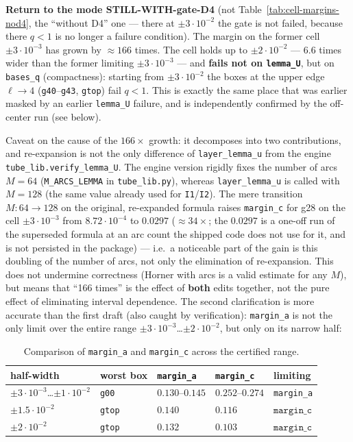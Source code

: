 \FloatBarrier

\textbf{Return to the mode STILL-WITH-gate-D4} (not Table~\ref{tab:cell-margins-nod4}, the ``without D4'' one ---
there at $\pm 3\cdot 10^{-2}$ the gate is not failed, because there $q<1$ is no longer
a failure condition). The margin on the former cell $\pm 3\cdot 10^{-3}$ has grown by
$\approx 166$ times. The cell holds up to $\pm 2\cdot 10^{-2}$ --- 6.6 times wider than the former
limiting $\pm 3\cdot 10^{-3}$ --- and \textbf{fails not on \texttt{lemma\_U}}, but on \texttt{bases\_q}
(compactness): starting from $\pm 3\cdot 10^{-2}$ the boxes at the upper edge
$\ell \to 4$ (\texttt{g40}--\texttt{g43}, \texttt{gtop}) fail $q < 1$. This is exactly the same place
that was earlier masked by an earlier \texttt{lemma\_U} failure, and is independently
confirmed by the off-center run (see below).

Caveat on the cause of the $166\times$ growth: it decomposes into two contributions,
and re-expansion is not the only difference of \texttt{layer\_\allowbreak lemma\_\allowbreak u} from the engine
\texttt{tube\_\allowbreak lib.verify\_\allowbreak lemma\_\allowbreak U}. The engine version rigidly fixes the number of
arcs $M=64$ (\texttt{M\_\allowbreak ARCS\_\allowbreak LEMMA} in \texttt{tube\_lib.py}), whereas \texttt{layer\_\allowbreak lemma\_\allowbreak u} is
called with $M=128$ (the same value already used for \texttt{I1}/\texttt{I2}). The mere
transition $M: 64\to 128$ on the original, re-expanded formula raises \texttt{margin\_c}
for g28 on the cell $\pm 3\cdot 10^{-3}$ from $8.72\cdot 10^{-4}$ to $0.0297$ ($\approx 34\times$; the $0.0297$ is a one-off run of the superseded formula at an arc count the shipped code does not use for it, and is not persisted in the package) --- i.e.\ a
noticeable part of the gain is this doubling of the number of arcs, not only
the elimination of re-expansion. This does not undermine correctness (Horner
with arcs is a valid estimate for any $M$), but means that ``166 times'' is
the effect of \textbf{both} edits together, not the pure effect of eliminating
interval dependence. The second clarification is more accurate than the first
draft (also caught by verification): \texttt{margin\_a} is not the only limit over
the entire range $\pm 3\cdot 10^{-3}$\ldots$\pm 2\cdot 10^{-2}$, but only on its narrow half:

\begin{table}[ht]
\centering
\caption{Comparison of \texttt{margin\_a} and \texttt{margin\_c} across the certified range.}
\label{tab:margin-a-vs-c}
\begin{tabular}{lllll}
\hline
half-width & worst box & \texttt{margin\_a} & \texttt{margin\_c} & limiting \\
\hline
$\pm 3\cdot 10^{-3}$\ldots$\pm 1\cdot 10^{-2}$ & \texttt{g00} & $0.130$--$0.145$ & $0.252$--$0.274$ & \texttt{margin\_a} \\
$\pm 1.5\cdot 10^{-2}$ & \texttt{gtop} & $0.140$ & $0.116$ & $\mathbf{\texttt{margin\_c}}$ \\
$\pm 2\cdot 10^{-2}$ & \texttt{gtop} & $0.132$ & $\mathbf{0.103}$ & $\mathbf{\texttt{margin\_c}}$ \\
\hline
\end{tabular}
\end{table}


